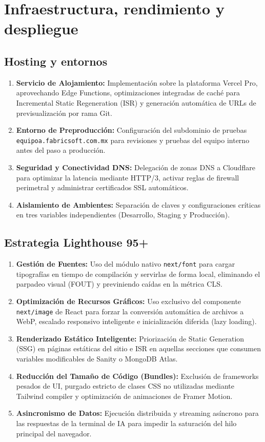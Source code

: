 \documentclass[11pt,letterpaper]{article}
\begin{document}
\section{Infraestructura, rendimiento y despliegue}

\subsection{Hosting y entornos}

\begin{enumerate}
\item \textbf{Servicio de Alojamiento:} Implementación sobre la plataforma Vercel Pro, aprovechando Edge Functions, optimizaciones integradas de caché para Incremental Static Regeneration (ISR) y generación automática de URLs de previsualización por rama Git.
\item \textbf{Entorno de Preproducción:} Configuración del subdominio de pruebas \texttt{equipoa.fabricsoft.com.mx} para revisiones y pruebas del equipo interno antes del paso a producción.
\item \textbf{Seguridad y Conectividad DNS:} Delegación de zonas DNS a Cloudflare para optimizar la latencia mediante HTTP/3, activar reglas de firewall perimetral y administrar certificados SSL automáticos.
\item \textbf{Aislamiento de Ambientes:} Separación de claves y configuraciones críticas en tres variables independientes (Desarrollo, Staging y Producción).
\end{enumerate}

\subsection{Estrategia Lighthouse 95+}

\begin{enumerate}
\item \textbf{Gestión de Fuentes:} Uso del módulo nativo \texttt{next/font} para cargar tipografías en tiempo de compilación y servirlas de forma local, eliminando el parpadeo visual (FOUT) y previniendo caídas en la métrica CLS.
\item \textbf{Optimización de Recursos Gráficos:} Uso exclusivo del componente \texttt{next/image} de React para forzar la conversión automática de archivos a WebP, escalado responsivo inteligente e inicialización diferida (lazy loading).
\item \textbf{Renderizado Estático Inteligente:} Priorización de Static Generation (SSG) en páginas estáticas del sitio e ISR en aquellas secciones que consumen variables modificables de Sanity o MongoDB Atlas.
\item \textbf{Reducción del Tamaño de Código (Bundles):} Exclusión de frameworks pesados de UI, purgado estricto de clases CSS no utilizadas mediante Tailwind compiler y optimización de animaciones de Framer Motion.
\item \textbf{Asincronismo de Datos:} Ejecución distribuida y streaming asíncrono para las respuestas de la terminal de IA para impedir la saturación del hilo principal del navegador.
\end{enumerate}
\end{document}
